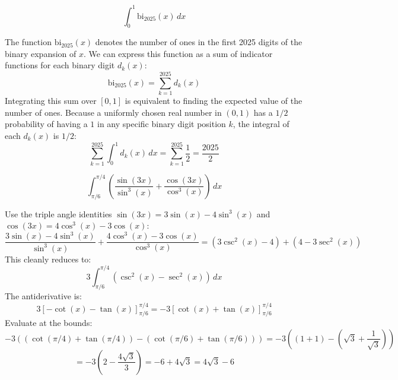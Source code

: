 \begin{questions}
    \question \[ \int_0^1 \text{bi}_{2025}(x) \,dx \]
    \begin{solution}
        The function $\text{bi}_{2025}(x)$ denotes the number of ones in the first 2025 digits of the binary expansion of $x$. We can express this function as a sum of indicator functions for each binary digit $d_k(x)$:
        \[ \text{bi}_{2025}(x) = \sum_{k=1}^{2025} d_k(x) \]
        Integrating this sum over $[0, 1]$ is equivalent to finding the expected value of the number of ones. Because a uniformly chosen real number in $(0,1)$ has a $1/2$ probability of having a $1$ in any specific binary digit position $k$, the integral of each $d_k(x)$ is $1/2$:
        \[ \sum_{k=1}^{2025} \int_0^1 d_k(x) \,dx = \sum_{k=1}^{2025} \frac{1}{2} = \frac{2025}{2} \]
    \end{solution}

    \question \[ \int_{\pi/6}^{\pi/4} \left( \frac{\sin(3x)}{\sin^3(x)} + \frac{\cos(3x)}{\cos^3(x)} \right) \,dx \]
    \begin{solution}
        Use the triple angle identities $\sin(3x) = 3\sin(x) - 4\sin^3(x)$ and $\cos(3x) = 4\cos^3(x) - 3\cos(x)$:
        \[ \frac{3\sin(x) - 4\sin^3(x)}{\sin^3(x)} + \frac{4\cos^3(x) - 3\cos(x)}{\cos^3(x)} = \left( 3\csc^2(x) - 4 \right) + \left( 4 - 3\sec^2(x) \right) \]
        This cleanly reduces to:
        \[ 3 \int_{\pi/6}^{\pi/4} (\csc^2(x) - \sec^2(x)) \,dx \]
        The antiderivative is:
        \[ 3 \left[ -\cot(x) - \tan(x) \right]_{\pi/6}^{\pi/4} = -3 \left[ \cot(x) + \tan(x) \right]_{\pi/6}^{\pi/4} \]
        Evaluate at the bounds:
        \[ -3 \left( (\cot(\pi/4) + \tan(\pi/4)) - (\cot(\pi/6) + \tan(\pi/6)) \right) = -3 \left( (1 + 1) - \left(\sqrt{3} + \frac{1}{\sqrt{3}}\right) \right) \]
        \[ = -3 \left( 2 - \frac{4\sqrt{3}}{3} \right) = -6 + 4\sqrt{3} = 4\sqrt{3} - 6 \]
    \end{solution}


\end{questions}
